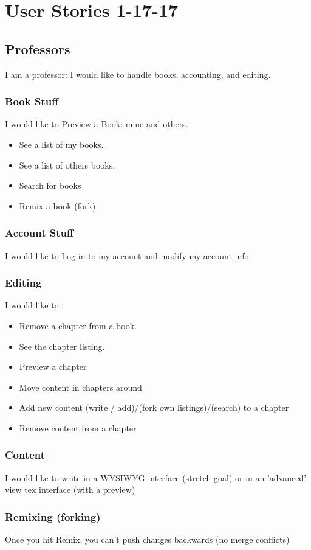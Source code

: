 \documentclass[onecolumn, draftclsnofoot,10pt, compsoc]{IEEEtran}
\begin{document}
\section{User Stories 1-17-17 \\}

\subsection{Professors}
\noindent I am a professor: I would like to handle books, accounting, and editing. \\

\subsubsection{Book Stuff}
\noindent I would like to Preview a Book: mine and others. \\
\begin{itemize}
  \item See a list of my books.
  \item See a list of others books.
  \item Search for books
  \item Remix a book (fork)
\end{itemize} 

\subsubsection{Account Stuff}
\noindent I would like to Log in to my account and modify my account info \\


\subsubsection{Editing}
\noindent I would like to: \\

\begin{itemize}
  \item Remove a chapter from a book.
  \item See the chapter listing.
  \item Preview a chapter
  \item Move content in chapters around
  \item Add new content (write / add)/(fork own listings)/(search) to a chapter
  \item Remove content from a chapter
\end{itemize}

\subsubsection{Content}
\noindent I would like to write in a WYSIWYG interface (stretch goal) or in an 'advanced' view tex interface (with a preview) \\

\subsubsection{Remixing (forking)}
\noindent Once you hit Remix, you can't push changes backwards (no merge conflicts) \\
\end{document}
